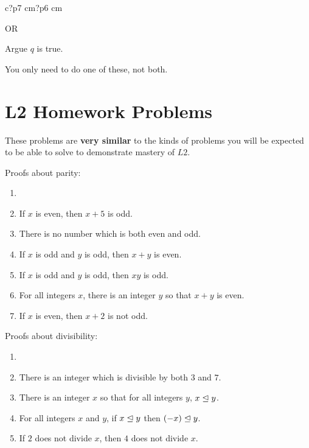 \begin{table}[h]
\begin{tabular}{c?p{7 cm}?p{6 cm}}
		
		\medskip
		
		OR
		
		\medskip
		
		Argue $q$ is true.
		
		\medskip
		
		You only need to do one of these, not both.
		
	\end{tabular}
\end{table}

\newpage

\section{L2 Homework Problems}

 These problems are \textbf{very similar} to the kinds of problems you will be expected to be able to solve to demonstrate mastery of $L2$.

Proofs about parity:

\begin{xca}
	\begin{enumerate}
		\item[] \mbox{}\\
		\item  If $x$ is even, then $x+5$ is odd. %
		\item  There is no number which is both even and odd.%
		\item  If $x$ is odd and $y$ is odd, then $x+y$ is even. %
		\item  If $x$ is odd and $y$ is odd, then $xy$ is odd. %
		\item  For all integers $x$, there is an integer $y$ so that $x+y$ is even. %
		\item  If $x$ is even, then $x+2$ is not odd. %
	\end{enumerate}
\end{xca}

Proofs about divisibility:

\begin{xca}		
	\begin{enumerate}
				\item[] \mbox{}\\
		\item  There is an integer which is divisible by both $3$ and $7$. %
		\item  There is an integer $x$ so that for all integers $y$,  $x \trianglelefteq y$.
		\item For all integers $x$ and $y$, if $x \trianglelefteq y$ then $(-x) \trianglelefteq y$.
		\item If $2$ does not divide $x$, then $4$ does not divide $x$. 
\end{enumerate}
\end{xca}


